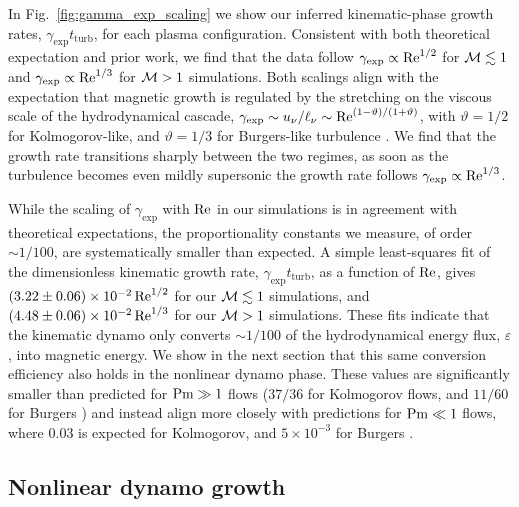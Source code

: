     In Fig.~\ref{fig:gamma_exp_scaling} we show our inferred kinematic-phase growth rates, $\gamma_\mathrm{exp} t_\mathrm{turb}$, for each plasma configuration. Consistent with both theoretical expectation and prior work, we find that the data follow $\gamma_\mathrm{exp} \propto \mathrm{Re}^{1/2}$ for $\mathcal{M} \lesssim 1$ and $\gamma_\mathrm{exp} \propto \mathrm{Re}^{1/3}$ for $\mathcal{M} > 1$ simulations. Both scalings align with the expectation that magnetic growth is regulated by the stretching on the viscous scale of the hydrodynamical cascade, $\gamma_\mathrm{exp} \sim u_\nu/\ell_\nu \sim \mathrm{Re}^{(1-\vartheta)/(1+\vartheta)}$, with $\vartheta = 1/2$ for Kolmogorov-like, and $\vartheta = 1/3$ for Burgers-like turbulence \citep{kulsrud1992spectrum, schekochihin2002model, schober2012magnetic}. We find that the growth rate transitions sharply between the two regimes, \ie as soon as the turbulence becomes even mildly supersonic the growth rate follows $\gamma_\mathrm{exp} \propto \mathrm{Re}^{1/3}$.

    While the scaling of $\gamma_\mathrm{exp}$ with $\mathrm{Re}$ in our simulations is in agreement with theoretical expectations, the proportionality constants we measure, of order $\sim 1/100$, are systematically smaller than expected. A simple least-squares fit of the dimensionless kinematic growth rate, $\gamma_\mathrm{exp} t_\mathrm{turb}$, as a function of $\mathrm{Re}$, gives $(3.22 \pm 0.06) \times 10^{-2} \,\mathrm{Re}^{1/2}$ for our $\mathcal{M} \lesssim 1$ simulations, and $(4.48 \pm 0.06) \times 10^{-2} \,\mathrm{Re}^{1/3}$ for our $\mathcal{M} > 1$ simulations. These fits indicate that the kinematic dynamo only converts $\sim 1/100$ of the hydrodynamical energy flux, $\varepsilon$, into magnetic energy. We show in the next section that this same conversion efficiency also holds in the nonlinear dynamo phase. These values are significantly smaller than predicted for $\mathrm{Pm} \gg 1$ flows ($37/36$ for Kolmogorov flows, and $11/60$ for Burgers \citep{schober2012small, schober2012magnetic}) and instead align more closely with predictions for $\mathrm{Pm} \ll 1$ flows, where $0.03$ is expected for Kolmogorov, and $5\times10^{-3}$ for Burgers \citep{schober2012small, schober2012magnetic, bovino2013turbulent}.

\subsection{Nonlinear dynamo growth}

